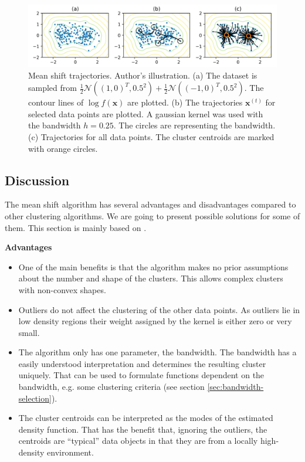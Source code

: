 \documentclass{article}
\begin{document}
\begin{figure}
	\centering
	\includegraphics[width=\textwidth]{figures/mean-shift-trajectories.png}
	\caption[Mean shift trajectories]{Mean shift trajectories. Author's illustration. (a) The dataset is sampled from $\frac{1}{2} \mathcal{N}\left((1, 0)^T, 0.5^2\right) + \frac{1}{2} \mathcal{N}\left((-1, 0)^T, 0.5^2\right)$. The contour lines of $\log \hat{f}(\bm{x})$ are plotted. (b) The trajectories $\bm{x}^{(t)}$ for selected data points are plotted. A gaussian kernel was used with the bandwidth $h=0.25$. The circles are representing the bandwidth. (c) Trajectories for all data points. The cluster centroids are marked with  orange circles.}
	\label{fig:mean-shift-trajectories}
\end{figure}



\subsection{Discussion} \label{sec:mean-shift-discussion}

The mean shift algorithm has several advantages and disadvantages compared to other clustering algorithms. We are going to present possible solutions for some of them. This section is mainly based on \cite{CarreiraPerpinan.2015}.

\textbf{Advantages}

\begin{itemize}
	\item One of the main benefits is that the algorithm makes no prior assumptions about the number and shape of the clusters. This allows complex clusters with non-convex shapes.
	
	\item Outliers do not affect the clustering of the other data points. As outliers lie in low density regions their weight assigned by the kernel is either zero or very small.
	
	\item The algorithm only has one parameter, the bandwidth. The bandwidth has a easily understood interpretation and determines the resulting cluster uniquely. That can be used to formulate functions dependent on the bandwidth, e.g. some clustering criteria (see section \ref{sec:bandwidth-selection}).
	
	\item The cluster centroids can be interpreted as the modes of the estimated density function. That has the benefit that, ignoring the outliers, the centroids are ``typical'' data objects in that they are from a locally high-density environment.
\end{itemize}
\end{document}

